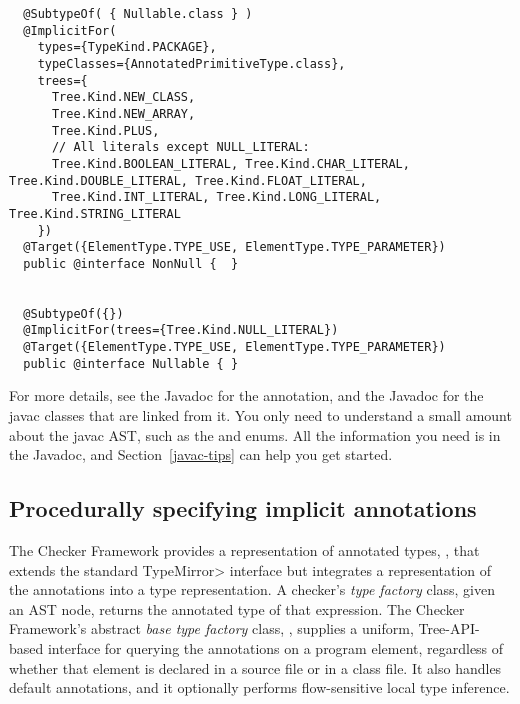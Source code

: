\begin{smaller}
\begin{Verbatim}
  @SubtypeOf( { Nullable.class } )
  @ImplicitFor(
    types={TypeKind.PACKAGE},
    typeClasses={AnnotatedPrimitiveType.class},
    trees={
      Tree.Kind.NEW_CLASS,
      Tree.Kind.NEW_ARRAY,
      Tree.Kind.PLUS,
      // All literals except NULL_LITERAL:
      Tree.Kind.BOOLEAN_LITERAL, Tree.Kind.CHAR_LITERAL, Tree.Kind.DOUBLE_LITERAL, Tree.Kind.FLOAT_LITERAL,
      Tree.Kind.INT_LITERAL, Tree.Kind.LONG_LITERAL, Tree.Kind.STRING_LITERAL
    })
  @Target({ElementType.TYPE_USE, ElementType.TYPE_PARAMETER})
  public @interface NonNull {  }


  @SubtypeOf({})
  @ImplicitFor(trees={Tree.Kind.NULL_LITERAL})
  @Target({ElementType.TYPE_USE, ElementType.TYPE_PARAMETER})
  public @interface Nullable { }
\end{Verbatim}
\end{smaller}

For more details, see the Javadoc for the 
  annotation, and the Javadoc for the javac classes that are linked from
it.  You only need to understand a small amount about the javac AST, such
as the
\href{\TreeAPIBase{}/tree/Tree.Kind.html?is-external=true}{}
and
enums.  All the information you need is in the Javadoc, and
Section~\ref{javac-tips} can help you get started.


\subsection{Procedurally specifying implicit annotations\label{procedurally-specifying-implicit-annotations}}


The Checker Framework provides a representation of annotated types,
, that extends the standard \<TypeMirror>
interface but integrates a representation of the annotations into a
type representation.  A checker's \emph{type factory} class, given an AST
node, returns the annotated type of that expression.  The Checker
Framework's abstract
\emph{base type factory} class, ,
supplies a uniform, Tree-API-based interface
for querying the annotations on a program element, regardless of
whether that element is declared in a source file or in a class file.
It also handles default annotations, and it optionally performs
flow-sensitive local type inference.

